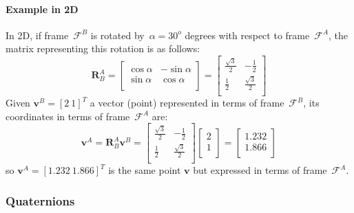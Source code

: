 \paragraph{Example in 2D}
In 2D, if frame~$\mathcal{F}^B$ is rotated by~$\alpha=30^o$ degrees with respect to frame~$\mathcal{F}^A$, the matrix representing this rotation is as follows: 
\begin{equation}
\mathbf{R}^A_B = 
\left[
\begin{array}{cc}
  \cos\alpha & -\sin\alpha\\
  \sin\alpha & \cos\alpha\\
\end{array}
\right] = 
\left[
\begin{array}{cc}
  \frac{\sqrt{3}}{2} & -\frac{1}{2}\\
  \frac{1}{2} & \frac{\sqrt{3}}{2}\\
\end{array}
\right] 
\end{equation}
Given $\mathbf{v}^B = [2\ 1]^T$ a vector (point) represented in terms of frame~$\mathcal{F}^B$, its coordinates in terms of frame~$\mathcal{F}^A$ are:
\begin{equation}
 \mathbf{v}^A = \mathbf{R}^A_B \mathbf{v}^B =
\left[
\begin{array}{cc}
  \frac{\sqrt{3}}{2} & -\frac{1}{2}\\
  \frac{1}{2} & \frac{\sqrt{3}}{2}\\
\end{array}
\right]
\left[
\begin{array}{c}
 2 \\
 1\\
\end{array}
\right] =
\left[
\begin{array}{c}
 1.232 \\
 1.866\\
\end{array}
\right]
\end{equation}
so $\mathbf{v}^A=[1.232\ 1.866]^T$ is the same point $\mathbf{v}$ but expressed in terms of frame~$\mathcal{F}^A$.


\subsubsection{Quaternions}
